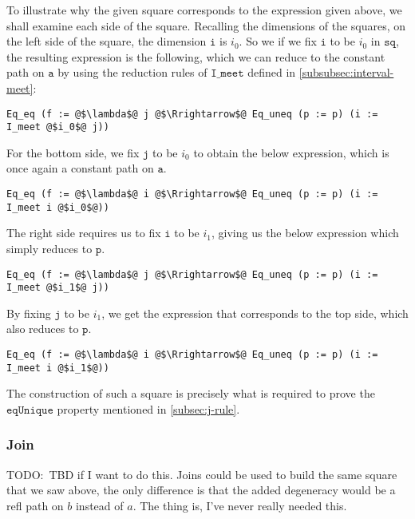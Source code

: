\documentclass[12pt,twoside,maitrise]{dms}
\theoremstyle{definition}
\numberwithin{equation}{section}
\numberwithin{table}{chapter}
\numberwithin{figure}{chapter}
\newcommand\fn[1] {\texttt{#1}}
\begin{document}
To illustrate why the given square corresponds to the expression given above, we
shall examine each side of the square. Recalling the dimensions of the squares,
on the left side of the square, the dimension $\fn{i}$ is $i_0$. So we if we fix
$\fn{i}$ to be $i_0$ in $\fn{sq}$, the resulting expression is the following,
which we can reduce to the constant path on $\fn{a}$ by using the reduction
rules of $\fn{I\_meet}$ defined in \autoref{subsubsec:interval-meet}:

\begin{verbatim}
Eq_eq (f := @$\lambda$@ j @$\Rrightarrow$@ Eq_uneq (p := p) (i := I_meet @$i_0$@ j))
\end{verbatim}

For the bottom side, we fix $\fn{j}$ to be $i_0$ to obtain the below expression,
which is once again a constant path on $\fn{a}$.

\begin{verbatim}
Eq_eq (f := @$\lambda$@ i @$\Rrightarrow$@ Eq_uneq (p := p) (i := I_meet i @$i_0$@))
\end{verbatim}

The right side requires us to fix $\fn{i}$ to be $i_1$, giving us the below
expression which simply reduces to $\fn{p}$.

\begin{verbatim}
Eq_eq (f := @$\lambda$@ j @$\Rrightarrow$@ Eq_uneq (p := p) (i := I_meet @$i_1$@ j))
\end{verbatim}

By fixing $\fn{j}$ to be $i_1$, we get the expression that corresponds to the top side, which also reduces to $\fn{p}$.

\begin{verbatim}
Eq_eq (f := @$\lambda$@ i @$\Rrightarrow$@ Eq_uneq (p := p) (i := I_meet i @$i_1$@))
\end{verbatim}

The construction of such a square is precisely what is required to
prove the $\fn{eqUnique}$ property mentioned in \autoref{subsec:j-rule}.

\subsubsection*{Join}

TODO:\ TBD if I want to do this. Joins could be used to build the same square
that we saw above, the only difference is that the added degeneracy would be
a refl path on $b$ instead of $a$. The thing is, I've never really needed
this.
\end{document}
